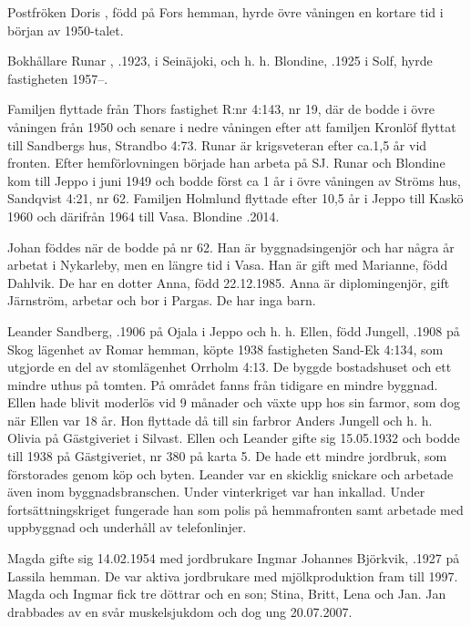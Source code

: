 Postfröken Doris , född på Fors hemman, hyrde övre våningen en kortare tid i början av 1950-talet.


Bokhållare Runar , .1923, i Seinäjoki, och h. h. Blondine, .1925 i Solf, hyrde fastigheten 1957--.
\begin{jhchildren}
  \item {}
  \item {}
\end{jhchildren}
Familjen flyttade från Thors fastighet R:nr 4:143, nr 19, där de bodde i övre våningen från 1950 och senare i nedre våningen efter att familjen Kronlöf flyttat till Sandbergs hus, Strandbo 4:73. Runar är krigsveteran efter ca.1,5 år vid fronten. Efter hemförlovningen började han arbeta på SJ. Runar och Blondine kom till Jeppo i juni 1949 och bodde först ca 1 år i övre våningen av Ströms hus, Sandqvist 4:21, nr 62. Familjen Holmlund flyttade efter 10,5 år i Jeppo till Kaskö 1960 och därifrån 1964 till Vasa. Blondine .2014.

Johan föddes när de bodde på nr 62. Han är byggnadsingenjör och har några år arbetat i Nykarleby, men en längre tid i Vasa. Han är gift med Marianne, född Dahlvik. De har en dotter Anna, född 22.12.1985. Anna är diplomingenjör, gift Järnström, arbetar och bor i Pargas. De har inga barn.


Leander Sandberg, .1906 på Ojala i Jeppo och h. h. Ellen, född Jungell, .1908 på Skog lägenhet av Romar hemman, köpte 1938 fastigheten Sand-Ek 4:134, som utgjorde en del av stomlägenhet Orrholm 4:13. De byggde bostadshuset och ett mindre uthus på tomten. På området fanns från tidigare en mindre byggnad. Ellen hade blivit moderlös vid 9 månader och växte upp hos sin farmor, som dog när Ellen var 18 år. Hon flyttade då till sin farbror Anders Jungell och h. h. Olivia på Gästgiveriet i Silvast. Ellen och Leander gifte sig 15.05.1932 och bodde till 1938 på Gästgiveriet, nr 380 på karta 5. De hade ett mindre jordbruk, som förstorades genom köp och byten. Leander var en skicklig snickare och arbetade även inom byggnadsbranschen. Under vinterkriget var han inkallad. Under fortsättningskriget fungerade han som polis på hemmafronten samt arbetade med uppbyggnad och underhåll av telefonlinjer.
\begin{jhchildren}
  \item {}
  \item {}
\end{jhchildren}
Magda gifte sig 14.02.1954 med jordbrukare Ingmar Johannes Björkvik, .1927 på Lassila hemman. De var aktiva jordbrukare med mjölkproduktion fram till 1997. Magda och Ingmar fick tre döttrar och en son; Stina, Britt, Lena och Jan. Jan drabbades av en svår muskelsjukdom och dog ung 20.07.2007.

